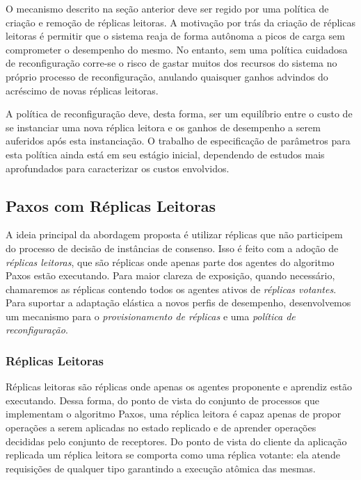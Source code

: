 O mecanismo descrito na seção anterior deve ser regido por uma política de criação e
remoção de réplicas leitoras. A  motivação por trás da criação de réplicas leitoras é
permitir que o sistema reaja de forma autônoma a picos de carga sem comprometer o
desempenho do mesmo. No entanto, sem uma política cuidadosa de reconfiguração corre-se o
risco de gastar muitos dos recursos do sistema no próprio processo de reconfiguração,
anulando quaisquer ganhos advindos do acréscimo de novas réplicas leitoras.

A política de reconfiguração deve, desta forma, ser um equilíbrio entre o custo de se
instanciar uma nova réplica leitora e os ganhos de desempenho a serem auferidos após esta
instanciação. O trabalho de especificação de parâmetros para esta política ainda está em
seu estágio inicial, dependendo de estudos mais aprofundados para caracterizar os custos
envolvidos.

\subsection{Paxos com Réplicas Leitoras}\label{sec:replicas_leitoras}

A ideia principal da abordagem proposta é utilizar réplicas que não participem do processo
de decisão de instâncias de consenso. Isso é feito com a adoção de \emph{réplicas
leitoras}, que são réplicas onde apenas parte dos agentes do algoritmo Paxos estão
executando. Para maior clareza de exposição, quando necessário, chamaremos as réplicas
contendo todos os agentes ativos de \emph{réplicas votantes}. Para suportar a adaptação
elástica a novos perfis de desempenho, desenvolvemos um mecanismo para o
\emph{provisionamento de réplicas} e uma \emph{política de reconfiguração}.

\subsubsection{Réplicas Leitoras}

Réplicas leitoras são réplicas onde apenas os agentes proponente e aprendiz estão
executando. Dessa forma, do ponto de vista do conjunto de processos que implementam o
algoritmo Paxos, uma réplica leitora é capaz apenas de propor operações a serem aplicadas
no estado replicado e de aprender operações decididas pelo conjunto de receptores. Do
ponto de vista do cliente da aplicação replicada um réplica leitora se comporta como uma
réplica votante: ela atende requisições de qualquer tipo garantindo a execução atômica das
mesmas.

